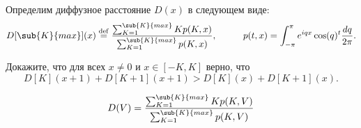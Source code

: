 \noindent
\phantom{42} \hspace{2cm}
Определим диффузное расстояние $D(x)$ в следующем виде:
\begin{equation*}
	D[\sub{K}{max}](x) \overset{\mathrm{def}}{=}  \frac{\sum_{K=1}^{\sub{K}{max}} K p(K, x)}{\sum_{K=1}^{\sub{K}{max}} p(K, x)}, \hspace{10 mm} p(t, x) = \int_{-\pi}^{\pi}  e^{i q x} \cos(q)^t \frac{dq}{2\pi}.
\end{equation*} \vspace{2mm}

\noindent
\phantom{42}  \hspace{2cm}
Докажите, что для всех $x \neq 0$ и $x \in [-K, K]$ верно, что
\begin{equation*}
	D[K](x+1) + D[K+1](x+1) > D[K](x) + D[K+1](x).
\end{equation*}

\noindent
\phantom{42}  \hspace{2cm}



\begin{equation*}
	D(V) = \frac{\sum_{K=1}^{\sub{K}{max}} K p(K, V)}{\sum_{K=1}^{\sub{K}{max}}  p(K, V)}
\end{equation*}



